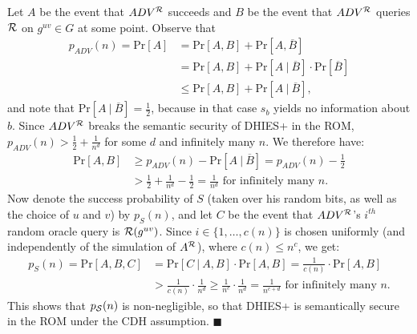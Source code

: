 Let $A$ be the event that $ADV^{\mathcal{R}}$ succeeds and $B$ be the event that
$ADV^{\mathcal{R}}$ queries $\mathcal{R}$ on $g^{uv} \in G$ at some point.
Observe that
\begin{align*} 
p_{ADV}(n) = \text{Pr}[A] &= \text{Pr}[A,B] +
\text{Pr}[A,\overline{B}]\\ & = \text{Pr}[A,B] + \text{Pr}[A \ | \
\overline{B}]\cdot\text{Pr}[\overline{B}] \\
& \leq \text{Pr}[A,B] + \text{Pr}[A \
| \ \overline{B}],
\end{align*} 
and note that Pr$[A \ | \ \overline{B}] = \frac{1}{2}$, because in that case
$s_b$ yields no information about $b$. Since $ADV^{\mathcal{R}}$ breaks the semantic
security of DHIES+ in the ROM, $p_{ADV}(n) > \frac{1}{2} + \frac{1}{n^d}$
for some $d$ and infinitely many $n$. We therefore have:
\begin{align*}
\text{Pr}[A,B] & \geq p_{ADV}(n) - \text{Pr}[A \ | \ \overline{B}]
 = p_{ADV}(n) - \frac{1}{2}\\
& > \frac{1}{2} + \frac{1}{n^d} - \frac{1}{2} = \frac{1}{n^d} \text{ for infinitely many } n.
\end{align*}
Now denote the success probability of $S$ (taken over his random bits, as well
as the choice of $u$ and $v$) by $p_S(n)$, and let $C$ be the event that
$ADV^{\mathcal{R}}$'s $i^{th}$ random oracle query is $\mathcal{R}(g^{uv})$. Since $i \in
\{1,\ldots,c(n)\}$ is chosen uniformly (and independently of the simulation
of $A^{\mathcal{R}}$), where $c(n) \leq n^c$, we get:
\begin{align*}
p_{S}(n) = \text{Pr}[A, B, C] &= \text{Pr}[C \ | \ A, B] \cdot \text{Pr}[A, B] 
= \frac{1}{c(n)} \cdot \text{Pr}[A, B] \\
&> \frac{1}{c(n)} \cdot \frac{1}{n^d} \geq \frac{1}{n^c}\cdot \frac{1}{n^d}
= \frac{1}{n^{c+d}} \text{ for infinitely many } n.
\end{align*}
This shows that $p_{\mathcal{S}}(n)$ is non-negligible, so that  DHIES+ is
semantically secure in the ROM under the CDH assumption. $\blacksquare$


